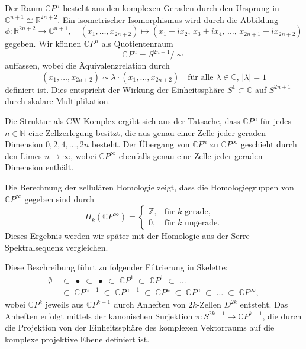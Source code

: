 \documentclass[12pt]{article}
\numberwithin{conj}{section}
\begin{document}
    Der Raum $\mathbb{C}P^{n}$ besteht aus den komplexen Geraden durch den Ursprung
    in $\mathbb{C}^{n+1}\cong \mathbb{R}^{2n+2}$. Ein isometrischer Isomorphismus
    wird durch die Abbildung
    \[
        \phi \colon \mathbb{R}^{2n+2}\to \mathbb{C}^{n+1}, \quad (x_{1}, \dots, x_{2n+2}) \mapsto (x_{1} + i x_{2},\, x_{3} + i x_{4},\, \dots,\, x_{2n+1}+  i x_{2n+2})
    \]
    gegeben. Wir können $\mathbb{C}P^{n}$ als Quotientenraum
    \[
        \mathbb{C}P^{n} = S^{2n+1}/ \sim
    \]
    auffassen, wobei die Äquivalenzrelation durch
    \[
        (x_{1}, \ldots, x_{2n+2}) \sim \lambda \cdot (x_{1}, \ldots, x_{2n+2}) \quad
        \text{für alle }\lambda \in \mathbb{C},\, |\lambda| = 1
    \]
    definiert ist. Dies entspricht der Wirkung der Einheitssphäre $S^{1} \subset \mathbb{C}$
    auf $S^{2n+1}$ durch skalare Multiplikation.

    Die Struktur als CW-Komplex ergibt sich aus der Tatsache, dass
    $\mathbb{C}P^{n}$ für jedes $n \in \mathbb{N}$ eine Zellzerlegung besitzt, die
    aus genau einer Zelle jeder geraden Dimension $0, 2, 4, \dots, 2n$ besteht.
    Der Übergang von $\mathbb{C}P^{n}$ zu $\mathbb{C}P^{\infty}$ geschieht durch
    den Limes $n \to \infty$, wobei $\mathbb{C}P^{\infty}$ ebenfalls genau eine Zelle
    jeder geraden Dimension enthält.

    Die Berechnung der zellulären Homologie zeigt, dass die Homologiegruppen von
    $\mathbb{C}P^{\infty}$ gegeben sind durch
    \[
        H_{k}(\mathbb{C}P^{\infty}) =
        \begin{cases}
            \mathbb{Z}, & \text{für } k \text{ gerade},   \\
            0,          & \text{für } k \text{ ungerade}.
        \end{cases}
    \]
    Dieses Ergebnis werden wir später mit der Homologie aus der Serre-Spektralsequenz
    vergleichen.

    Diese Beschreibung führt zu folgender Filtrierung in Skelette:
    \begin{align*}
        \emptyset & \;\subset\; \bullet \;\subset\; \bullet \;\subset\; \mathbb{C}P^{1} \;\subset\; \mathbb{C}P^{1} \;\subset\; \dots                                                     \\
                  & \;\subset\; \mathbb{C}P^{n-1}\;\subset\; \mathbb{C}P^{n-1}\;\subset\; \mathbb{C}P^{n} \;\subset\; \mathbb{C}P^{n} \;\subset\; \dots \;\subset\; \mathbb{C}P^{\infty},
    \end{align*}
    wobei $\mathbb{C}P^{k}$ jeweils aus $\mathbb{C}P^{k-1}$ durch Anheften von $2k$-Zellen
    $D^{2k}$ entsteht. Das Anheften erfolgt mittels der kanonischen Surjektion
    $\pi \colon S^{2k-1}\to \mathbb{C}P^{k-1}$, die durch die Projektion von der Einheitssphäre
    des komplexen Vektorraums auf die komplexe projektive Ebene definiert ist.
\end{document}
